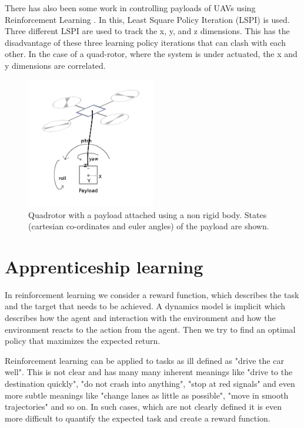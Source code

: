 \documentclass[BTech]{iitmdiss}
\begin{document}
There has also been some work in controlling payloads of UAVs using Reinforcement Learning \cite{PayloadLSPI}. In this, Least Square Policy Iteration (LSPI) is used. Three different LSPI are used to track the x, y, and z dimensions. This has the disadvantage of these three learning policy iterations that can clash with each other. In the case of a quad-rotor, where the system is under actuated, the x and y dimensions are correlated.

\begin{figure}[h]
  \centering
    \includegraphics[width=0.5\textwidth]{payload.png}
    \caption{Quadrotor with a payload attached using a non rigid body. States (cartesian co-ordinates and euler angles) of the payload are shown.}
\end{figure}

\section{Apprenticeship learning}

In reinforcement learning we consider a reward function, which describes the task and the target that needs to be achieved. A dynamics model is implicit which describes how the agent and interaction with the environment and how the environment reacts to the action from the agent. Then we try to find an optimal policy that maximizes the expected return.

Reinforcement learning can be applied to tasks as ill defined as "drive the car well". This is not clear and has many many inherent meanings like "drive to the destination quickly", "do not crash into anything", "stop at red signals" and even more subtle meanings like "change lanes as little as possible", "move in smooth trajectories" and so on. In such cases, which are not clearly defined it is even more difficult to quantify the expected task and create a reward function.
\end{document}

